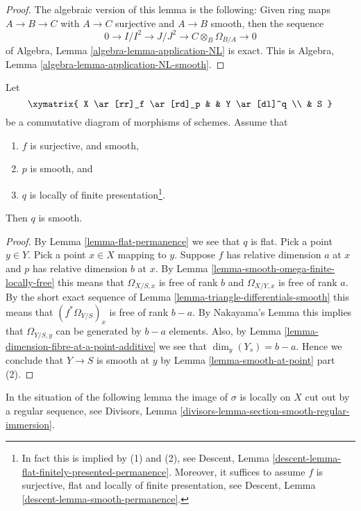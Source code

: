 \begin{proof}
The algebraic version of this lemma is the following:
Given ring maps $A \to B \to C$ with $A \to C$ surjective and $A \to B$
smooth, then the sequence
$$
0 \to I/I^2 \to J/J^2 \to C \otimes_B \Omega_{B/A} \to 0
$$
of
Algebra, Lemma \ref{algebra-lemma-application-NL}
is exact. This is
Algebra, Lemma \ref{algebra-lemma-application-NL-smooth}.
\end{proof}

\begin{lemma}
\label{lemma-smooth-permanence}
Let
$$
\xymatrix{
X \ar[rr]_f \ar[rd]_p & &
Y \ar[dl]^q \\
& S
}
$$
be a commutative diagram of morphisms of schemes. Assume that
\begin{enumerate}
\item $f$ is surjective, and smooth,
\item $p$ is smooth, and
\item $q$ is locally of finite presentation\footnote{In fact this
is implied by (1) and (2), see
Descent, Lemma \ref{descent-lemma-flat-finitely-presented-permanence}.
Moreover, it suffices to assume $f$ is surjective, flat and locally
of finite presentation, see
Descent, Lemma \ref{descent-lemma-smooth-permanence}.}.
\end{enumerate}
Then $q$ is smooth.
\end{lemma}

\begin{proof}
By Lemma \ref{lemma-flat-permanence} we see that $q$ is flat.
Pick a point $y \in Y$. Pick a point $x \in X$ mapping to $y$.
Suppose $f$ has relative dimension $a$ at $x$ and $p$ has relative
dimension $b$ at $x$. By Lemma \ref{lemma-smooth-omega-finite-locally-free}
this means that $\Omega_{X/S, x}$ is free of rank $b$ and $\Omega_{X/Y, x}$
is free of rank $a$. By the short exact sequence
of Lemma \ref{lemma-triangle-differentials-smooth}
this means that $(f^*\Omega_{Y/S})_x$ is free
of rank $b - a$. By Nakayama's Lemma this implies that
$\Omega_{Y/S, y}$ can be generated by $b - a$ elements.
Also, by Lemma \ref{lemma-dimension-fibre-at-a-point-additive} we see that
$\dim_y(Y_s) = b - a$. Hence we conclude that
$Y \to S$ is smooth at $y$ by Lemma \ref{lemma-smooth-at-point} part (2).
\end{proof}

\noindent
In the situation of the following lemma the image of $\sigma$ is
locally on $X$ cut out by a regular sequence, see
Divisors, Lemma \ref{divisors-lemma-section-smooth-regular-immersion}.

